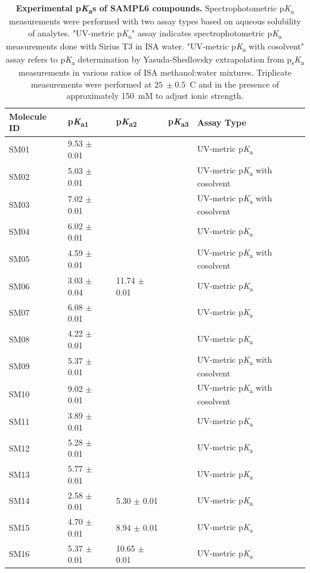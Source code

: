 \documentclass[9pt,lineno]{elife}
\newcommand{\pKa}{p\textit{K}\textsubscript{a}}
\newcommand{\psKa}{p\textsubscript{s}\textit{K}\textsubscript{a}}
\begin{document}
\begin{table}[tb!]
\begin{center}
\begin{threeparttable}
\centering
\caption{{\bf Experimental \pKa{}s of SAMPL6 compounds.} 
Spectrophotometric \pKa{} measurements were performed with two assay types based on aqueous solubility of analytes. "UV-metric \pKa" assay indicates spectrophotometric \pKa{} measurements done with Sirius T3 in ISA water. 
"UV-metric \pKa{} with cosolvent" assay refers to \pKa{} determination by Yasuda-Shedlovsky extrapolation from \psKa{} measurements in various ratios of ISA methanol:water mixtures. Triplicate measurements were performed at $25~\pm 0.5$\textdegree~C and in the presence of approximately 150~mM  to adjust ionic strength.} 
\label{UV-metric_pKa_table}
\begin{tabular}{@{}lllll@{}}
\toprule
{\bf Molecule ID} & {\bf \pKa \textsubscript{1}} & {\bf \pKa \textsubscript{2}} & {\bf \pKa \textsubscript{3}} & {\bf Assay Type} \\ \midrule
SM01 & 9.53 $\pm$ 0.01 &  &  & UV-metric \pKa{} \\
SM02 & 5.03 $\pm$ 0.01 &  &  & UV-metric \pKa{} with cosolvent \\
SM03 & 7.02 $\pm$ 0.01 &  &  & UV-metric \pKa{} with cosolvent \\
SM04 & 6.02 $\pm$ 0.01 &  &  & UV-metric \pKa{} \\
SM05 & 4.59 $\pm$ 0.01 &  &  & UV-metric \pKa{} with cosolvent \\
SM06 & 3.03 $\pm$ 0.04 & 11.74 $\pm$ 0.01 &  & UV-metric \pKa{} \\
SM07 & 6.08 $\pm$ 0.01 &  &  & UV-metric \pKa{} \\
SM08 & 4.22 $\pm$ 0.01 &  &  & UV-metric \pKa{} \\
SM09 & 5.37 $\pm$ 0.01 &  &  & UV-metric \pKa{} with cosolvent \\
SM10 & 9.02 $\pm$ 0.01 &  &  & UV-metric \pKa{} with cosolvent \\
SM11 & 3.89 $\pm$ 0.01 &  &  & UV-metric \pKa{} \\
SM12 & 5.28 $\pm$ 0.01 &  &  & UV-metric \pKa{} \\
SM13 & 5.77 $\pm$ 0.01 &  &  & UV-metric \pKa{} \\
SM14 & 2.58 $\pm$ 0.01 & 5.30 $\pm$ 0.01 &  & UV-metric \pKa{} \\
SM15 & 4.70 $\pm$ 0.01 & 8.94 $\pm$ 0.01 &  & UV-metric \pKa{} \\
SM16 & 5.37 $\pm$ 0.01 & 10.65 $\pm$ 0.01 &  & UV-metric \pKa{} \\

\end{tabular}
\end{threeparttable}
\end{center}
\end{table}
\end{document}
